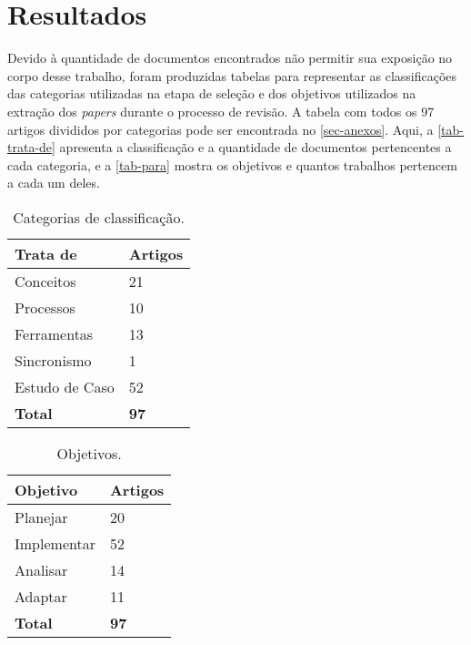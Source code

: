 \documentclass[
article,			%
11pt,				%
oneside,			%
a4paper,			%
english,			%
brazil,				%
sumario=tradicional
]{abntex2}
\begin{document}
  \section{Resultados}
  \label{sec-resultados}

  Devido à quantidade de documentos encontrados não permitir sua exposição no corpo desse trabalho, foram produzidas tabelas para representar as classificações das categorias utilizadas na etapa de seleção e dos objetivos utilizados na extração dos \textit{papers} durante o processo de revisão. A tabela com todos os 97 artigos divididos por categorias pode ser encontrada no \autoref{sec-anexos}. Aqui, a \autoref{tab-trata-de} apresenta a classificação e a quantidade de documentos pertencentes a cada categoria, e a \autoref{tab-para} mostra os objetivos e quantos trabalhos pertencem a cada um deles.

  \begin{table}[htb]
    \ABNTEXfontereduzida
    \caption[Categorias de classificação]{Categorias de classificação.}
    \label{tab-trata-de}
    \begin{center}
      \begin{tabular}{p{3.0cm}|p{2.0cm}}
        \textbf{Trata de} & \textbf{Artigos} \\
        \hline
        Conceitos & 21 \\
        \hline
        Processos & 10 \\
        \hline
        Ferramentas & 13\\
        \hline
        Sincronismo & 1\\
        \hline
        Estudo de Caso & 52\\
        \hline
        \textbf{Total} & \textbf{97} \\
      \end{tabular}
    \end{center}
  \end{table}

  \begin{table}[htb]
    \ABNTEXfontereduzida
    \caption[Objetivos]{Objetivos.}
    \label{tab-para}
    \begin{center}
      \begin{tabular}{p{3.0cm}|p{2.0cm}}
        \textbf{Objetivo} & \textbf{Artigos} \\
        \hline
        Planejar & 20 \\
        \hline
        Implementar & 52 \\
        \hline
        Analisar & 14 \\
        \hline
        Adaptar & 11 \\
        \hline
        \textbf{Total} & \textbf{97} \\
      \end{tabular}
    \end{center}
  \end{table}
\end{document}
